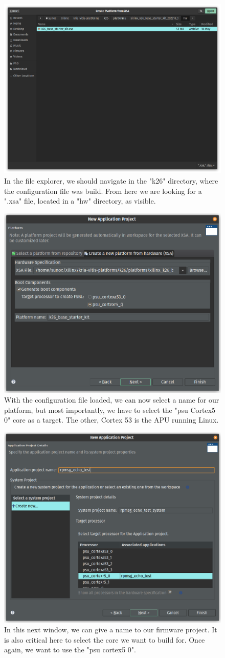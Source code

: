 \documentclass[10pt]{article}
\begin{document}
\begin{figure}[htbp]
\centering
\includegraphics[width=.6\textwidth]{./img/vitis_new/project3.png}
\caption{\label{fig:orge8a7274}In the file explorer, we should navigate in the "k26" directory, where the configuration file was build. From here we are looking for a ".xsa" file, located in a "hw" directory, as visible.}
\end{figure}

\begin{figure}[htbp]
\centering
\includegraphics[width=.6\textwidth]{./img/vitis_new/project4.png}
\caption{\label{fig:org2b14ca5}With the configuration file loaded, we can now select a name for our platform, but most importantly, we have to select the "psu Cortex5 0" core as a target. The other, Cortex 53 is the APU running Linux.}
\end{figure}

\begin{figure}[htbp]
\centering
\includegraphics[width=.6\textwidth]{./img/vitis_new/project5.png}
\caption{\label{fig:org62e2a01}In this next window, we can give a name to our firmware project. It is also critical here to select the core we want to build for. Once again, we want to use the "psu cortex5 0".}
\end{figure}
\end{document}

